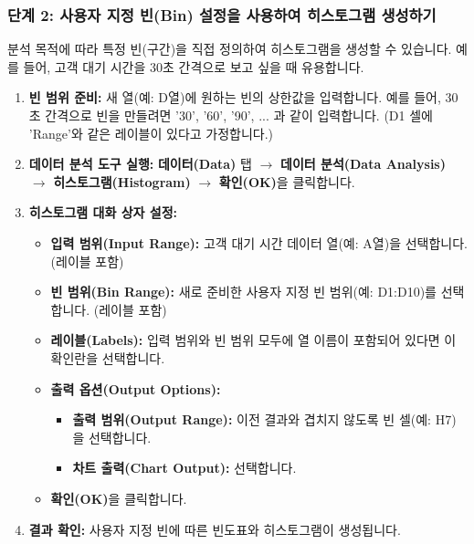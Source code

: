 \documentclass[11pt,a4paper]{article}
\begin{document}
\subsubsection*{단계 2: 사용자 지정 빈(Bin) 설정을 사용하여 히스토그램 생성하기}
분석 목적에 따라 특정 빈(구간)을 직접 정의하여 히스토그램을 생성할 수 있습니다. 예를 들어, 고객 대기 시간을 30초 간격으로 보고 싶을 때 유용합니다.

\begin{enumerate}
    \item \textbf{빈 범위 준비:} 새 열(예: D열)에 원하는 빈의 상한값을 입력합니다. 예를 들어, 30초 간격으로 빈을 만들려면 '30', '60', '90', ... 과 같이 입력합니다. (D1 셀에 'Range'와 같은 레이블이 있다고 가정합니다.)
    \item \textbf{데이터 분석 도구 실행:} \textbf{데이터(Data)} 탭 $\rightarrow$ \textbf{데이터 분석(Data Analysis)} $\rightarrow$ \textbf{히스토그램(Histogram)} $\rightarrow$ \textbf{확인(OK)}을 클릭합니다.
    \item \textbf{히스토그램 대화 상자 설정:}
    \begin{itemize}
        \item \textbf{입력 범위(Input Range):} 고객 대기 시간 데이터 열(예: A열)을 선택합니다. (레이블 포함)
        \item \textbf{빈 범위(Bin Range):} 새로 준비한 사용자 지정 빈 범위(예: D1:D10)를 선택합니다. (레이블 포함)
        \item \textbf{레이블(Labels):} 입력 범위와 빈 범위 모두에 열 이름이 포함되어 있다면 이 확인란을 선택합니다.
        \item \textbf{출력 옵션(Output Options):}
        \begin{itemize}
            \item \textbf{출력 범위(Output Range):} 이전 결과와 겹치지 않도록 빈 셀(예: H7)을 선택합니다.
            \item \textbf{차트 출력(Chart Output):} 선택합니다.
        \end{itemize}
        \item \textbf{확인(OK)}을 클릭합니다.
    \end{itemize}
    \item \textbf{결과 확인:} 사용자 지정 빈에 따른 빈도표와 히스토그램이 생성됩니다.
\end{enumerate}
\end{document}
